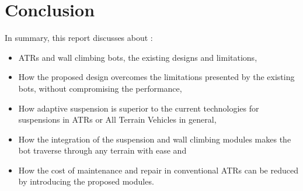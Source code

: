 \section{Conclusion}
In summary, this report discusses about :
\begin{itemize}
    \item ATRs and wall climbing bots, the existing designs and limitations,
    \item How the proposed design overcomes the limitations presented by the existing bots, without compromising the performance,
    \item How adaptive suspension is superior to the current technologies for suspensions in ATRs or All Terrain Vehicles in general,
    \item How the integration of the suspension and wall climbing modules makes the bot traverse through any terrain with ease and
    \item How the cost of maintenance and repair in conventional ATRs can be reduced by introducing the proposed modules.
\end{itemize}
